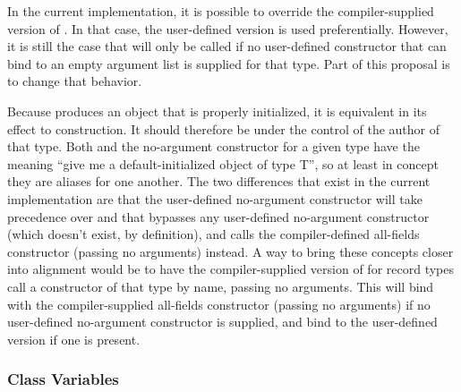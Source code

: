 In the current implementation, it is possible to override the compiler-supplied version of
.  In that case, the user-defined version is used preferentially.
However, it is still the case that  will only be called if no
user-defined constructor that can bind to an empty argument list is supplied for that
type.  Part of this proposal is to change that behavior.

Because  produces an object that is properly initialized, it is
equivalent in its effect to construction.  It should therefore be under the control of the
author of that type.  Both  and the no-argument constructor for a given
type have the meaning ``give me a default-initialized object of type T'', so at least in
concept they are aliases for one another.  The two differences that exist in the current
implementation are that the user-defined no-argument constructor will take precedence over
 and that  bypasses any user-defined no-argument
constructor (which doesn't exist, by definition), and calls the compiler-defined
all-fields constructor (passing no arguments) instead.  A way to bring these concepts
closer into alignment would be to have the compiler-supplied version of
 for record types call a constructor of that type by name, passing no
arguments.  This will bind with the compiler-supplied all-fields constructor (passing no
arguments) if no user-defined no-argument constructor is supplied, and bind to the
user-defined version if one is present.

\subsubsection{Class Variables}

